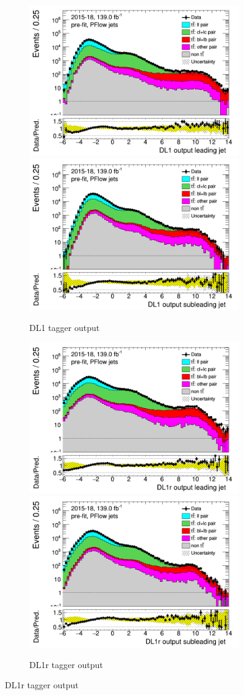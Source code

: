\documentclass[letterpaper,12pt]{article}
\begin{document}
\begin{figure}[H]
	\begin{subfigure}[t]{1\linewidth}
	\includegraphics[width=.45\textwidth]{FTAG_plots/pretagNoRwwithhighpTPFlowall/DataMC_h_J0_DL1_log.png}
	\includegraphics[width=.45\textwidth]{FTAG_plots/pretagNoRwwithhighpTPFlowall/DataMC_h_J1_DL1_log.png}\\
	\caption{DL1 tagger output}
	\end{subfigure}
	\begin{subfigure}[t]{1\linewidth}
		\includegraphics[width=.45\textwidth]{FTAG_plots/pretagNoRwwithhighpTPFlowall/DataMC_h_J0_DL1r_log.png}
		\includegraphics[width=.45\textwidth]{FTAG_plots/pretagNoRwwithhighpTPFlowall/DataMC_h_J1_DL1r_log.png}\\
		\caption{DL1r tagger output}

\end{subfigure}
\end{figure}
\end{document}
